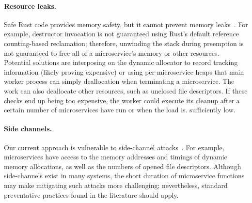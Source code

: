 
\paragraph{Resource leaks.}
Safe Rust code provides memory safety, but it cannot prevent memory
leaks~\cite{www-rustlang-nu}.  For example, destructor invocation is not
guaranteed using Rust's default reference counting-based reclamation; therefore,
unwinding the stack during preemption is not guaranteed to free all of a
microservice's memory or other resources.  Potential solutions are interposing
on the dynamic allocator to record tracking information (likely proving
expensive) or using per-microservice heaps that main worker process can simply
deallocation when terminating a microservice.  The work can also deallocate
other resources, such as unclosed file descriptors.  If these checks end up
being too expensive, the worker could execute its cleanup after a certain number
of microservices have run or when the load is. sufficiently low.

\paragraph{Side channels.}
Our current approach is vulnerable to side-channel
attacks~\cite{Lipp2018,Kocher2018}.  For example, microservices have access to
the memory addresses and timings of dynamic memory allocations, as well as the
numbers of opened file descriptors.  Although side-channels exist in many
systems, the short duration of microservice functions may
make mitigating such attacks more challenging; nevertheless, standard
preventative practices found in the literature should apply.

